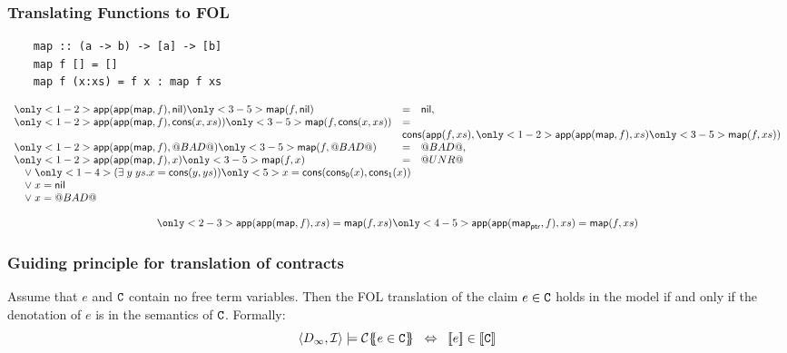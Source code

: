 \documentclass[serif,professionalfont]{beamer}
\begin{document}
\begin{frame}[fragile]
  \frametitle{Translating Functions to FOL}

  \begin{verbatim}
    map :: (a -> b) -> [a] -> [b]
    map f [] = []
    map f (x:xs) = f x : map f xs
  \end{verbatim}

  \newcommand\cmap[2]{
    \only<1-2>{\appp{\maps}{#1}{#2}}
    \only<3-5>{\map{#1}{#2}}
  }

  \[\begin{array}{lll}
  \cmap{f}{\nil}         & = & \nil, \\
  \cmap{f}{\cons{x}{xs}} & = & \\
                         & \multicolumn{2}{l}{\cons{\app{f}{xs}}{\cmap{f}{xs}}}  \\
  \cmap{f}{\bad}         & = & \bad, \\
  \cmap{f}{x}            & = & \unr \\
  \multicolumn{3}{l}{\quad \lor \; \only<1-4>{(\exists \; y \; ys . x = \cons{y}{ys})}
                                   \only<5>{x = \cons{\conspi{x}}{\conspii{x}}}} \\
  \multicolumn{3}{l}{\quad \lor \; x = \nil} \\
  \multicolumn{3}{l}{\quad \lor \; x = \bad} \\
  \\
  \multicolumn{3}{c}{
    \only<2-3>{\appp{\maps}{f}{xs} = \map{f}{xs}}
    \only<4-5>{\appp{\ptr{\maps}}{f}{xs} = \map{f}{xs}}
  }
  \end{array}\]
\end{frame}

\begin{frame}[fragile]
  \frametitle{Guiding principle for translation of contracts}

  \begin{theorem}
    Assume that $e$ and ${\tt C}$ contain no free term variables. Then
    the FOL translation of the claim $e \in {\tt C}$ holds in the model
    if and only if the denotation of $e$ is in the semantics of
    ${\tt C}$.  Formally:
    $$\langle D_\infty,{\cal I}\rangle \models \trc{e \in \Ct}
      \;\; \Leftrightarrow \;\; \dbrace{e} \in \dbrace{\Ct}
    $$
  \end{theorem}
\end{frame}
\end{document}
